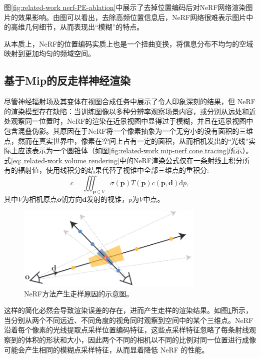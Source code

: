 图\ref{fig:related-work nerf-PE-ablation}中展示了去掉位置编码后对NeRF网络渲染图片的效果影响。由图可以看出，去除高频位置信息后，NeRF网络很难表示图片中的高维几何细节，从而表现出“模糊”的特点。

从本质上，NeRF的位置编码实质上也是一个扭曲变换，将信息分布不均匀的空域映射到更加均匀的频域空间。

\subsection{基于Mip的反走样神经渲染}
尽管神经辐射场\cite{mildenhall_nerf_2020}及其变体\cite{muller_instant_2022,martin-brualla_nerf_2021,zhang_nerf_2020}在视图合成任务中展示了令人印象深刻的结果，但 NeRF 的渲染模型存在缺陷：当训练图像以多种分辨率观察场景内容，或分别从远处和近处观察同一位置时，NeRF的渲染在近景视图中显得过于模糊，并且在远景视图中包含混叠伪影。其原因在于NeRF将一个像素抽象为一个无穷小的没有面积的三维点，然而在真实世界中，像素在空间上占有一定的面积，从而相机发出的“光线”实际上应该表示为一个圆锥体（如图\ref{fig:related-work mip-nerf cone tracing}所示）。式\ref{eq: related-work volume rendering}中的NeRF渲染公式仅在一条射线上积分所有的辐射值，使用线积分的结果代替了视锥中全部三维点的重积分:
\begin{equation}
    c = \iiint_{\mathbf{p}\in V}\sigma(\mathbf{p})T(\mathbf{p})c(\mathbf{p},\mathbf{d})\text{d}p,
\end{equation}
其中$V$为相机原点$\mathbf{o}$朝方向$\mathbf{d}$发射的视锥，$p$为$V$中点。

\begin{figure}[ht]
    \centering
    \includegraphics[width=0.8\textwidth]{undergraduate-thesis/images/related-work/mipnerf-intersection.png}
    \caption{NeRF方法产生走样原因的示意图\cite{barron_mip-nerf_2021}。}
    \label{fig:related-work mip-nerf intersection}
\end{figure}

这样的简化必然会导致渲染误差的存在，进而产生走样的渲染结果。如图\ref{fig:related-work mip-nerf intersection}所示，当分别从两个不同远近、不同角度的视角同时观察到空间中的某个三维点。NeRF沿着每个像素的光线提取点采样位置编码特征，这些点采样特征忽略了每条射线观察到的体积的形状和大小，因此两个不同的相机以不同的比例对同一位置进行成像可能会产生相同的模糊点采样特征，从而显着降低 NeRF 的性能。

